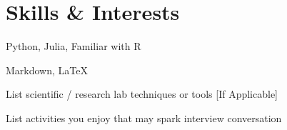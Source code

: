 \documentclass[letterpaper,11pt]{article}
\begin{document}
\section{Skills \& Interests}
\begin{description}[itemsep=0pt]
	\item[Programming Language] Python, Julia, Familiar with R
	\item[Markup Language] Markdown, \LaTeX
	\item[Laboratory] List scientific / research lab techniques or tools [If Applicable]
	\item[Interests] List activities you enjoy that may spark interview conversation
\end{description}
	
\end{document}
